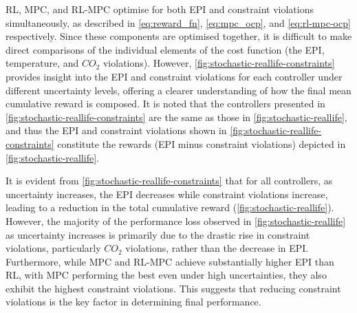 RL, MPC, and RL-MPC optimise for both EPI and constraint violations simultaneously, as described in \autoref{eq:reward_fn}, \autoref{eq:mpc_ocp}, and \autoref{eq:rl-mpc-ocp} respectively. Since these components are optimised together, it is difficult to make direct comparisons of the individual elements of the cost function (the EPI, temperature, and $CO_2$ violations). However, \autoref{fig:stochastic-reallife-constraints} provides insight into the EPI and constraint violations for each controller under different uncertainty levels, offering a clearer understanding of how the final mean cumulative reward is composed. It is noted that the controllers presented in \autoref{fig:stochastic-reallife-constraints} are the same as those in \autoref{fig:stochastic-reallife}, and thus the EPI and constraint violations shown in \autoref{fig:stochastic-reallife-constraints} constitute the rewards (EPI minus constraint violations) depicted in \autoref{fig:stochastic-reallife}.

It is evident from \autoref{fig:stochastic-reallife-constraints} that for all controllers, as uncertainty increases, the EPI decreases while constraint violations increase, leading to a reduction in the total cumulative reward (\autoref{fig:stochastic-reallife}). However, the majority of the performance loss observed in \autoref{fig:stochastic-reallife} as uncertainty increases is primarily due to the drastic rise in constraint violations, particularly $CO_2$ violations, rather than the decrease in EPI. Furthermore, while MPC and RL-MPC achieve substantially higher EPI than RL, with MPC performing the best even under high uncertainties, they also exhibit the highest constraint violations. This suggests that reducing constraint violations is the key factor in determining final performance.





